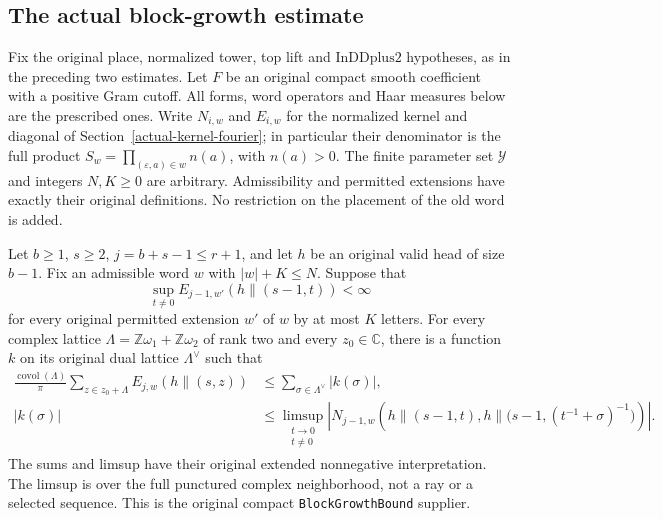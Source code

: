 \subsection{The actual block-growth estimate}
\label{actual-block-growth}

Fix the original place, normalized tower, top lift and
$\mathrm{InDDplus2}$ hypotheses, as in the preceding two estimates.
Let $F$ be an original compact smooth coefficient with a positive
Gram cutoff.  All forms, word operators and Haar measures below are
the prescribed ones.  Write $N_{i,w}$ and $E_{i,w}$ for the normalized
kernel and diagonal of Section~\ref{actual-kernel-fourier}; in
particular their denominator is the full product
$S_w=\prod_{(\varepsilon,a)\in w}n(a)$, with $n(a)>0$.
The finite parameter set $\mathcal Y$ and integers $N,K\ge0$ are
arbitrary.  Admissibility and permitted extensions have exactly
their original definitions.  No restriction on the placement of
the old word is added.\cite{block-growth-source}

\begin{theorem}\label{block-growth-actual}
Let $b\ge1$, $s\ge2$, $j=b+s-1\le r+1$, and let $h$ be an
original valid head of size $b-1$.  Fix an admissible word $w$ with
$|w|+K\le N$.  Suppose that
\[
 \sup_{t\ne0}E_{j-1,w'}(h\mathbin{\|}(s-1,t))<\infty
\]
for every original permitted extension $w'$ of $w$ by at most $K$
letters.  For every complex lattice
$\Lambda=\mathbb Z\omega_1+\mathbb Z\omega_2$ of rank two and
every $z_0\in\mathbb C$, there is a function $k$ on its original
dual lattice $\Lambda^\vee$ such that
\begin{align}
 \frac{\operatorname{covol}(\Lambda)}\pi
       \sum_{z\in z_0+\Lambda}E_{j,w}(h\mathbin{\|}(s,z))
       &\le\sum_{\sigma\in\Lambda^\vee}|k(\sigma)|,
                                                   \label{block-growth-lattice}\\
 |k(\sigma)|&\le
 \limsup_{\substack{t\to0\\t\ne0}}
 \left|N_{j-1,w}\left(h\mathbin{\|}(s-1,t),
        h\mathbin{\|}\bigl(s-1,(t^{-1}+\sigma)^{-1}\bigr)\right)\right|.
                                                   \label{block-growth-limsup}
\end{align}
The sums and limsup have their original extended nonnegative
interpretation.  The limsup is over the full punctured complex
neighborhood, not a ray or a selected sequence.  This is the
original compact \texttt{BlockGrowthBound} supplier.
\end{theorem}

